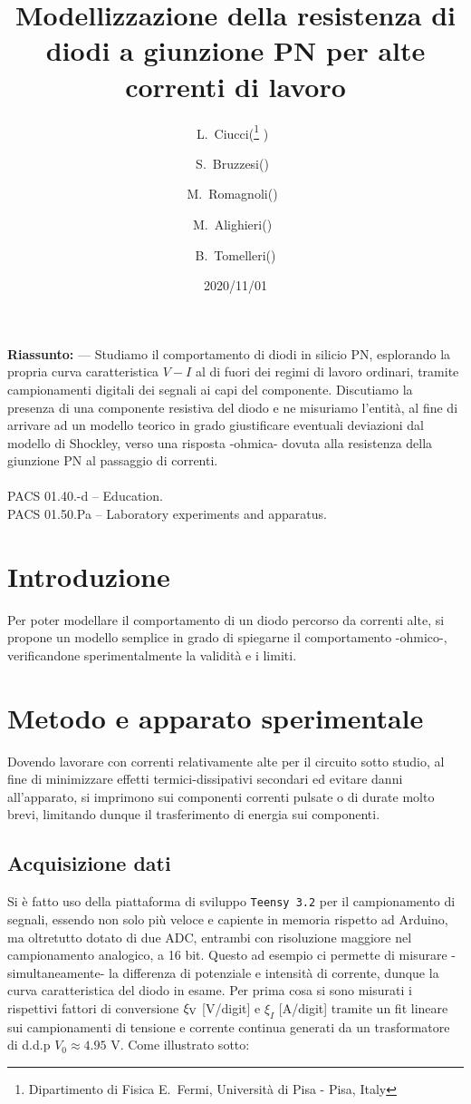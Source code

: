 \documentclass{article}[a4paper, oneside, 11pt]
\title{Modellizzazione della resistenza di diodi a giunzione PN per alte correnti di lavoro}
\author{L.~Ciucci(\thanks{Dipartimento di Fisica E.~Fermi, Universit\`a di Pisa - Pisa, Italy} )~\and S.~Bruzzesi(\protect\footnotemark[1] )~\and M.~Romagnoli(\protect\footnotemark[1] )~\and M.~Alighieri(\protect\footnotemark[1] )~\and B.~Tomelleri(\protect\footnotemark[1] )}
\date{2020/11/01}
\begin{document}
\maketitle

\begin{mdframed}
\textbf{Riassunto:} --- Studiamo il comportamento di diodi in silicio PN, esplorando la propria curva caratteristica $V - I$ al di fuori dei regimi di lavoro ordinari, tramite campionamenti digitali dei segnali ai capi del componente. Discutiamo la presenza di una componente resistiva del diodo e ne misuriamo l'entità, al fine di arrivare ad un modello teorico in grado giustificare eventuali deviazioni dal modello di Shockley, verso una risposta -ohmica- dovuta alla resistenza della giunzione PN al passaggio di correnti.\\\\
PACS 01.40.-d – Education.\\
PACS 01.50.Pa – Laboratory experiments and apparatus.
\end{mdframed}

\section{Introduzione}
Per poter modellare il comportamento di un diodo percorso da correnti alte, si propone un modello semplice in grado di spiegarne il comportamento -ohmico-, verificandone sperimentalmente la validità e i limiti.
\section{Metodo e apparato sperimentale}
Dovendo lavorare con correnti relativamente alte per il circuito sotto studio, al fine di minimizzare effetti termici-dissipativi secondari ed evitare danni all'apparato, si imprimono sui componenti correnti pulsate o di durate molto brevi, limitando dunque il trasferimento di energia sui componenti.
\subsection{Acquisizione dati}
Si è fatto uso della piattaforma di sviluppo \verb+Teensy 3.2+\cite{teensy} per il campionamento di segnali, essendo non solo più veloce e capiente in memoria rispetto ad Arduino, ma oltretutto dotato di due ADC, entrambi con risoluzione maggiore nel campionamento analogico, a 16 bit. Questo ad esempio ci permette di misurare -simultaneamente- la differenza di potenziale e intensità di corrente, dunque la curva caratteristica del diodo in esame. Per prima cosa si sono misurati i rispettivi fattori di conversione $\xi_{\rm V}$ [V/digit] e $\xi_I$ [A/digit] tramite un fit lineare sui campionamenti di tensione e corrente continua generati da un trasformatore di d.d.p $V_0 \approx 4.95$ V. Come illustrato sotto:

\end{document}

